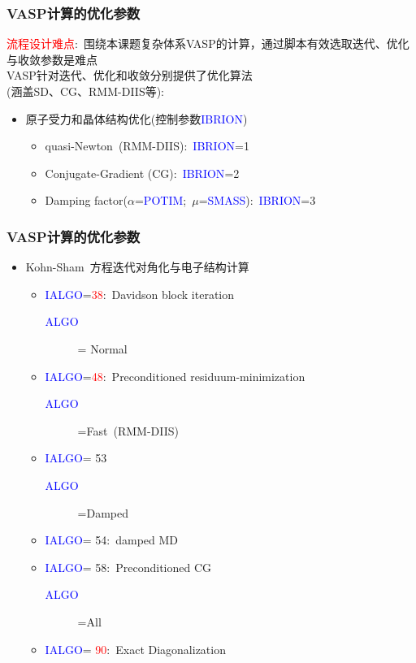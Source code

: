 \documentclass[cjk,slidestop,handout,compress,mathserif,blue]{beamer}	%
\begin{document}
\frame
{
	\frametitle{\textrm{VASP}计算的优化参数}
	\textcolor{red}{流程设计难点}:~围绕本课题复杂体系\textrm{VASP}的计算，通过脚本有效选取迭代、优化与收敛参数是难点\\
	\textrm{VASP}针对迭代、优化和收敛分别提供了优化算法\\
	(涵盖\textrm{SD}、\textrm{CG}、\textrm{RMM-DIIS}等):
	\begin{itemize}
		\item 原子受力和晶体结构优化(控制参数\textcolor{blue}{IBRION})
			\begin{itemize}
		        \setlength{\itemsep}{15pt}
		   \item \textrm{quasi-Newton~(RMM-DIIS)}:~\textcolor{blue}{IBRION}=1
		   \item \textrm{Conjugate-Gradient (CG)}:~\textcolor{blue}{IBRION}=2
		   \item \textrm{Damping factor($\alpha$=\textcolor{blue}{POTIM};~$\mu$=\textcolor{blue}{SMASS})}:~\textcolor{blue}{IBRION}=3
			\end{itemize}
	\end{itemize}
}

\frame
{
	\frametitle{\textrm{VASP}计算的优化参数}
	\begin{itemize}
		\item \textrm{Kohn-Sham~}方程迭代对角化与电子结构计算
			\begin{itemize}
		\item \textcolor{blue}{IALGO}=\textcolor{red}{\textrm{38}}:~\textrm{Davidson block iteration}
			\begin{description}
				\item[\textcolor{blue}{ALGO}] = \textrm{Normal}
			\end{description}
		\item \textcolor{blue}{IALGO}=\textcolor{red}{\textrm{48}}:~\textrm{Preconditioned residuum-minimization} 
			\begin{description}
				\item[\textcolor{blue}{ALGO}]=\textrm{Fast~{(RMM-DIIS)}}
			\end{description}
		\item \textcolor{blue}{IALGO}= \textrm{53}
			\begin{description}
				\item[\textcolor{blue}{ALGO}]=\textrm{Damped} 
			\end{description}
		\item \textcolor{blue}{IALGO}= \textrm{54}:~\textrm{damped MD}
		\item \textcolor{blue}{IALGO}= \textrm{58}:~\textrm{Preconditioned CG}
			\begin{description}
				\item[\textcolor{blue}{ALGO}]=\textrm{All} 
			\end{description}
		\item \textcolor{blue}{IALGO}= \textcolor{red}{\textrm{90}}:~\textrm{Exact Diagonalization}
	\end{itemize}
	\end{itemize}
}
\end{document}
